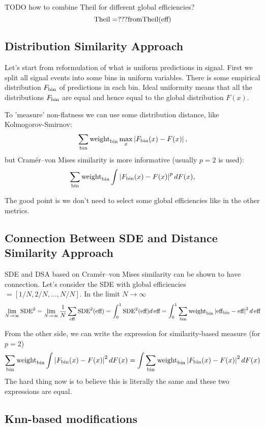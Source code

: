 \documentclass{JINST}
\theoremstyle{definition}
\theoremstyle{remark}
\newcommand{\abs}[1]{\left\vert#1\right\vert}
\begin{document}
TODO how to combine Theil for different global efficiencies?
\[
	\text{Theil} = ??? \text{from} \text{Theil}(\text{eff})
\]

\subsection{Distribution Similarity Approach}
\label{sec:similarity}

Let's start from reformulation of what is uniform predictions in signal. First we split all signal events into some bins in uniform variables. There is some empirical distribution $F_{\text{bin}}$ of predictions in each bin. Ideal uniformity means that all the distributions $F_{\text{bin}}$ are equal and hence equal to the global distribution $F(x)$. 

To 'measure' non-flatness we can use some distribution distance, like Kolmogorov-Smirnov:
\[
	 \sum_{\bin} \binweight \max_x \abs{F_{\bin}(x) - F(x)},
\]
but Cram\'er--von Mises similarity is more informative (usually $p=2$ is used):
\[
	 \sum_{\bin} \binweight \int \abs{F_{\bin}(x) - F(x)}^p dF(x),
\]

The good point is we don't need to select some global efficiencies like in the other metrics.


\subsection{Connection Between SDE and Distance Similarity Approach}

SDE and DSA based on Cram\'er--von Mises similarity can be shown to have connection.
Let's consider the SDE with global efficiencies $= [1/N, 2/N, \dots, N/N]$. In the limit $N \to \infty$
\[
	\lim_{N \to \infty} \SDE^2 = 
	\lim_{N \to \infty} \frac{1}{N} \sum_{\globaleff}\SDE^2(\globaleff) = 
	\int_0^1 \SDE^2(\globaleff) d\, \globaleff = 
	\int_0^1 \sum_{\bin} \binweight \abs{\bineff - \globaleff}^2 d\, \globaleff
\]

From the other side, we can write the expression for similarity-based measure (for $p=2$) 
\[
	\sum_{\bin} \binweight \int \abs{F_\text{bin}(x) - F(x)}^2 dF(x) =
	\int \sum_{\bin} \binweight \abs{F_\text{bin}(x) - F(x)}^2 dF(x) 
\] The hard thing now is to believe this is literally the same and these two expressions are equal.


\subsection{Knn-based modifications}
\end{document}
